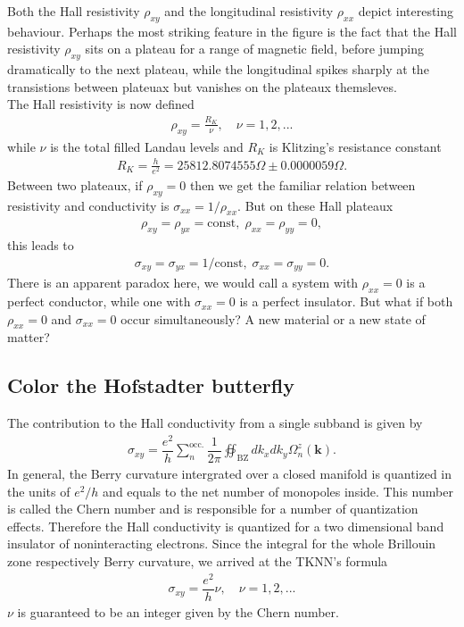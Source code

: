 \documentclass{report}
\newcommand{\dps}{\displaystyle}
\newcommand{\f}[2]{\dfrac{#1}{#2}}
\begin{document}
\noindent Both the Hall resistivity $\rho_{xy}$ and the longitudinal resistivity $\rho_{xx}$ depict interesting behaviour. Perhaps the most striking feature in the figure is the fact that the Hall resistivity $\rho_{xy}$ sits on a plateau for a range of magnetic field, before jumping dramatically to the next plateau, while the longitudinal spikes sharply at the transistions between plateuax but vanishes on the plateaux themsleves. \\
The Hall resistivity is now defined
\begin{gather}
	\rho_{xy} = \frac{R_{K}}{\nu}, \quad \nu = 1,2,...
\end{gather}
while $\nu$ is the total filled Landau levels and $R_{K}$ is Klitzing's resistance constant
\begin{gather}
	R_{K} = \frac{h}{e^{2}} = 25812.8074555 \Omega \pm 0.0000059 \Omega.
\end{gather}
Between two plateaux, if $\rho_{xy}  = 0$ then we get the familiar relation between resistivity and conductivity is $\sigma_{xx} = 1/\rho_{xx}$. But on these Hall plateaux
\begin{gather}
	\rho_{xy} = \rho_{yx} = \text{const} ,\; \rho_{xx} = \rho_{yy} = 0 ,
\end{gather}
this leads to
\begin{gather}
	\sigma_{xy} = \sigma_{yx} = 1 / \text{const} , \; \sigma_{xx} = \sigma_{yy} = 0.
\end{gather}
There is an apparent paradox here, we would call a system with $\rho_{xx} = 0$ is a perfect conductor, while one with $\sigma_{xx} = 0$ is a perfect insulator. But what if both $\rho_{xx} = 0$ and $\sigma_{xx} = 0$ occur simultaneously? A new material or a new state of matter?


\subsection{Color the Hofstadter butterfly}
The contribution to the Hall conductivity from a single subband is given by \cite{kohmoto1989,hatsugai1990energy,kohmoto1985topological,thouless1982}
\begin{gather}
	\sigma_{xy} = \f{e^{2}}{h} \sum_{n}^{\text{occ.}} \f{1}{2\pi} \dps\oiint_{\text{{BZ}}} d k_{x} d k_{y} \Omega_{n}^{z} (\mathbf{k}).
\end{gather}
In general, the Berry curvature intergrated over a closed manifold is quantized in the units of $e^{2} / h$ and equals to the net number of monopoles inside. This number is called the Chern number and is responsible for a number of quantization effects. Therefore the Hall conductivity is quantized for a two dimensional band insulator of noninteracting electrons. Since the integral for the whole Brillouin zone respectively Berry curvature, we arrived at the \ac{TKNN}'s formula \cite{thouless1982}
\begin{gather}
	\sigma_{xy} = \f{e^{2}}{h} \nu, \quad \nu = 1,2,...
\end{gather}
$\nu$ is guaranteed to be an integer given by the Chern number.
\end{document}

